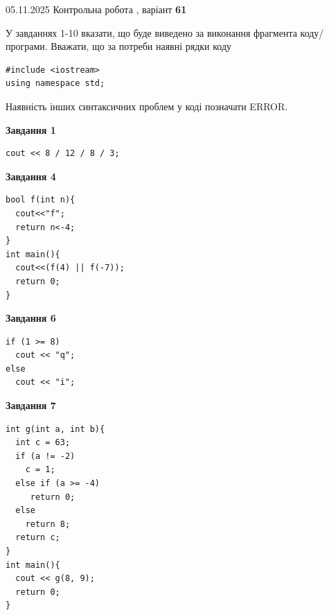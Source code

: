 \documentclass[12pt, ukrainian]{article}
\begin{document}
{\Large{05.11.2025 Контрольна робота , варіант  \No \textbf { 61 }\par}}
{
\begin {large}
У завданнях 1-10 вказати, що буде виведено за виконання фрагмента коду/про\-гра\-ми.
Вважати, що за потреби наявні рядки коду
\begin{verbatim}
#include <iostream>
using namespace std;
\end{verbatim}
Наявність інших синтаксичних проблем у коді позначати ERROR.

\begin{minipage}[t]{7.0cm}

\begin{center}
\textbf{Завдання 1}
\end{center}
\vspace{-8mm}

\begin{verbatim}
cout << 8 / 12 / 8 / 3;
\end{verbatim}



\begin{center}
\textbf{Завдання 4}
\end{center}
\vspace{-8mm}

\begin{verbatim}
bool f(int n){
  cout<<"f";
  return n<-4;
}
int main(){
  cout<<(f(4) || f(-7));
  return 0;
}
\end{verbatim}



\begin{center}
\textbf{Завдання 6}
\end{center}
\vspace{-8mm}

\begin{verbatim}
if (1 >= 8)
  cout << "q";
else
  cout << "i";
\end{verbatim}



\begin{center}
\textbf{Завдання 7}
\end{center}
\vspace{-8mm}

\begin{verbatim}
int g(int a, int b){
  int c = 63;
  if (a != -2)
    c = 1;
  else if (a >= -4)
     return 0;
  else
    return 8;
  return c;
}
int main(){
  cout << g(8, 9);
  return 0;
}
\end{verbatim}


\end{minipage}
\end{large}}
\end{document}
